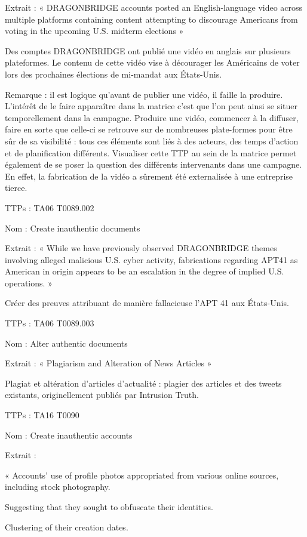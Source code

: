 Extrait : « DRAGONBRIDGE accounts posted an English-language video across multiple platforms containing content attempting to discourage Americans from voting in the upcoming U.S. midterm elections »

Des comptes DRAGONBRIDGE ont publié une vidéo en anglais sur plusieurs plateformes. Le contenu de cette vidéo vise à décourager les Américains de voter lors des prochaines élections de mi-mandat aux États-Unis.

Remarque : il est logique qu’avant de publier une vidéo, il faille la produire. L’intérêt de le faire apparaître dans la matrice c’est que l’on peut ainsi se situer temporellement dans la campagne. Produire une vidéo, commencer à la diffuser, faire en sorte que celle-ci se retrouve sur de nombreuses plate-formes pour être sûr de sa visibilité : tous ces éléments sont liés à des acteurs, des temps d’action et de planification différents. Visualiser cette TTP au sein de la matrice permet également de se poser la question des différents intervenants dans une campagne. En effet, la fabrication de la vidéo a sûrement été externalisée à une entreprise tierce.

TTPs : TA06 T0089.002

Nom : Create inauthentic documents

Extrait : « While we have previously observed DRAGONBRIDGE themes involving alleged malicious U.S. cyber activity, fabrications regarding APT41 as American in origin appears to be an escalation in the degree of implied U.S. operations. »

Créer des preuves attribuant de manière fallacieuse l'APT 41 aux États-Unis.

TTPs : TA06 T0089.003

Nom : Alter authentic documents

Extrait : « Plagiarism and Alteration of News Articles »

Plagiat et altération d'articles d'actualité : plagier des articles et des tweets existants, originellement publiés par Intrusion Truth.

TTPs : TA16 T0090

Nom : Create inauthentic accounts

Extrait : 

    « Accounts' use of profile photos appropriated from various online sources, including stock photography. 

    Suggesting that they sought to obfuscate their identities. 

    Clustering of their creation dates. 

